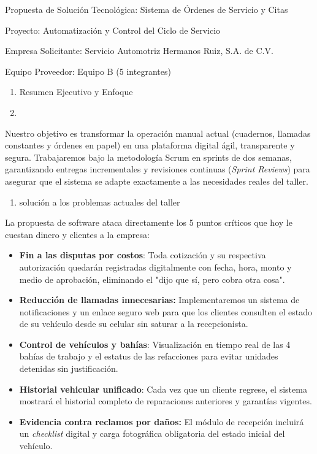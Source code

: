 \documentclass[
  spanish,
  11pt,
  letterpaper,
]{article}
\author{}
\date{}
\begin{document}
Propuesta de Solución Tecnológica: Sistema de Órdenes de Servicio y
Citas

Proyecto: Automatización y Control del Ciclo de Servicio

Empresa Solicitante: Servicio Automotriz Hermanos Ruiz, S.A. de C.V.

Equipo Proveedor: Equipo B (5 integrantes)

\begin{enumerate}
\def\labelenumi{\arabic{enumi}.}
\item
  Resumen Ejecutivo y Enfoque
\item
\end{enumerate}

Nuestro objetivo es transformar la operación manual actual (cuadernos,
llamadas constantes y órdenes en papel) en una plataforma digital ágil,
transparente y segura. Trabajaremos bajo la metodología Scrum en sprints
de dos semanas, garantizando entregas incrementales y revisiones
continuas (\emph{Sprint Reviews}) para asegurar que el sistema se adapte
exactamente a las necesidades reales del taller.

\begin{enumerate}
\def\labelenumi{\arabic{enumi}.}
\setcounter{enumi}{2}
\item
  solución a los problemas actuales del taller
\end{enumerate}

La propuesta de software ataca directamente los 5 puntos críticos que
hoy le cuestan dinero y clientes a la empresa:

\begin{itemize}
\item
  \textbf{Fin a las disputas por costos}: Toda cotización y su
  respectiva autorización quedarán registradas digitalmente con fecha,
  hora, monto y medio de aprobación, eliminando el "dijo que sí, pero
  cobra otra cosa".
\item
  \textbf{Reducción de llamadas innecesarias:} Implementaremos un
  sistema de notificaciones y un enlace seguro web para que los clientes
  consulten el estado de su vehículo desde su celular sin saturar a la
  recepcionista.
\item
  \textbf{Control de vehículos y bahías}: Visualización en tiempo real
  de las 4 bahías de trabajo y el estatus de las refacciones para evitar
  unidades detenidas sin justificación.
\item
  \textbf{Historial vehicular unificado}: Cada vez que un cliente
  regrese, el sistema mostrará el historial completo de reparaciones
  anteriores y garantías vigentes.
\item
  \textbf{Evidencia contra reclamos por daños:} El módulo de recepción
  incluirá un \emph{checklist} digital y carga fotográfica obligatoria
  del estado inicial del vehículo.
\end{itemize}
\end{document}

